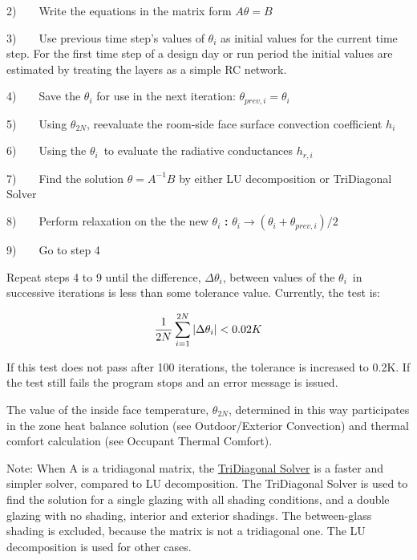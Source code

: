 2)~~~~Write the equations in the matrix form \(A\theta = B\)

3)~~~~Use previous time step's values of \({\theta_i}\) as initial values for the current time step. For the first time step of a design day or run period the initial values are estimated by treating the layers as a simple RC network.

4)~~~~Save the \({\theta_i}\) for use in the next iteration: \({\theta_{prev,i}} = {\theta_i}\)

5)~~~~Using \({\theta_{2N}}\), reevaluate the room-side face surface convection coefficient \({h_i}\)

6)~~~~Using the \({\theta_i}\)~to evaluate the radiative conductances \({h_{r,i}}\)

7)~~~~Find the solution \(\theta = {A^{ - 1}}B\) by either LU decomposition or TriDiagonal Solver

8)~~~~Perform relaxation on the the new \({\theta_i}\) \textbf{:} \({\theta_i} \to \left( {{\theta_i} + {\theta_{prev,i}}} \right)/2\)

9)~~~~Go to step 4

Repeat steps 4 to 9 until the difference, \(\Delta {\theta_i}\), between values of the \({\theta_i}\)~in successive iterations is less than some tolerance value. Currently, the test is:

\begin{equation}
\frac{1}{{2N}}\sum\limits_{i = 1}^{2N} {|\Delta {\theta_i}|{\rm{ }} < 0.02K}
\end{equation}

If this test does not pass after 100 iterations, the tolerance is increased to 0.2K. If the test still fails the program stops and an error message is issued.

The value of the inside face temperature, \({\theta_{2N}}\), determined in this way participates in the zone heat balance solution (see Outdoor/Exterior Convection) and thermal comfort calculation (see Occupant Thermal Comfort).

Note: When A is a tridiagonal matrix, the \href{https://en.wikipedia.org/wiki/Tridiagonal_matrix_algorithm}{TriDiagonal Solver} is a faster and simpler solver, compared to LU decomposition. The TriDiagonal Solver is used to find the solution for a single glazing with all shading conditions, and a double glazing with no shading, interior and exterior shadings. The between-glass shading is excluded, because the matrix is not a tridiagonal one. The LU decomposition is used for other cases.


